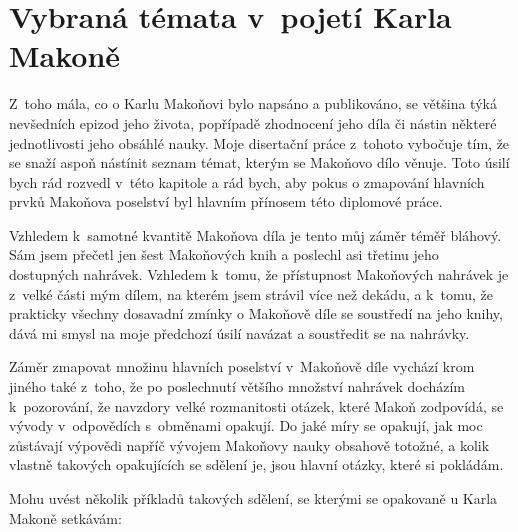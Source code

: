 \chapter{Vybraná témata v~pojetí Karla Makoně}
\label{kap:temata}

Z~toho mála, co o Karlu Makoňovi bylo napsáno a publikováno, se většina týká
nevšedních epizod jeho života, popřípadě zhodnocení jeho díla či nástin některé
jednotlivosti jeho obsáhlé nauky. Moje disertační práce z~tohoto vybočuje tím,
že se snaží aspoň nástínit seznam témat, kterým se Makoňovo dílo věnuje. Toto
úsilí bych rád rozvedl v~této kapitole a rád bych, aby pokus o zmapování
hlavních prvků Makoňova poselství byl hlavním přínosem této diplomové práce.

Vzhledem k~samotné kvantitě Makoňova díla je tento můj záměr téměř bláhový. Sám
jsem přečetl jen šest Makoňových knih a poslechl asi třetinu jeho
dostupných nahrávek. Vzhledem k~tomu, že přístupnost Makoňových nahrávek je
z~velké části mým dílem, na kterém jsem strávil více než dekádu, a k~tomu, že
prakticky všechny dosavadní zmínky o Makoňově díle se soustředí na jeho knihy,
dává mi smysl na moje předchozí úsilí navázat a soustředit se na nahrávky.

Záměr zmapovat množinu hlavních poselství v~Makoňově díle vychází krom jiného
také z~toho, že po poslechnutí většího množství nahrávek docházím k~pozorování,
že navzdory velké rozmanitosti otázek, které Makoň zodpovídá, se vývody
v~odpovědích s~obměnami opakují. Do jaké míry se opakují, jak moc zůstávají
výpovědi napříč vývojem Makoňovy nauky obsahově totožné, a kolik vlastně
takových opakujících se sdělení je, jsou hlavní otázky, které si pokládám.

Mohu uvést několik příkladů takových sdělení, se kterými se
opakovaně u Karla Makoně setkávám:

